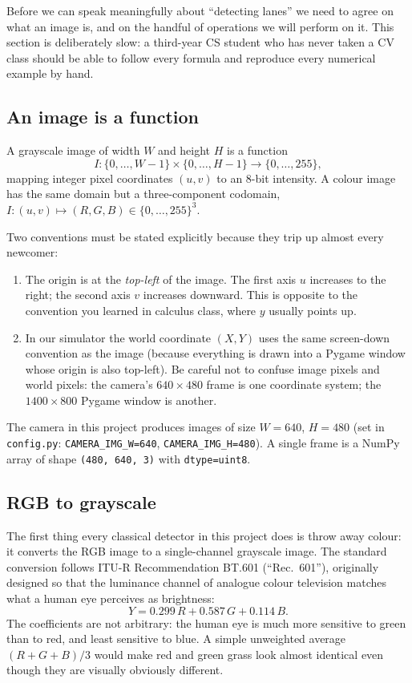 Before we can speak meaningfully about ``detecting lanes'' we need to
agree on what an image is, and on the handful of operations we will
perform on it. This section is deliberately slow: a third-year CS
student who has never taken a CV class should be able to follow every
formula and reproduce every numerical example by hand.

\subsection{An image is a function}

\begin{definition}
A grayscale image of width $W$ and height $H$ is a function
\[
I : \{0,\ldots,W-1\}\times\{0,\ldots,H-1\}\to\{0,\ldots,255\},
\]
mapping integer pixel coordinates $(u,v)$ to an 8-bit intensity. A
colour image has the same domain but a three-component codomain,
$I:(u,v)\mapsto(R,G,B)\in\{0,\ldots,255\}^3$.
\end{definition}

Two conventions must be stated explicitly because they trip up almost
every newcomer:
\begin{enumerate}[leftmargin=2em,itemsep=2pt]
  \item The origin is at the \emph{top-left} of the image. The first
        axis $u$ increases to the right; the second axis $v$ increases
        downward. This is opposite to the convention you learned in
        calculus class, where $y$ usually points up.
  \item In our simulator the world coordinate $(X,Y)$ uses the same
        screen-down convention as the image (because everything is
        drawn into a Pygame window whose origin is also top-left). Be
        careful not to confuse image pixels and world pixels: the
        camera's $640\times480$ frame is one coordinate system; the
        $1400\times800$ Pygame window is another.
\end{enumerate}
The camera in this project produces images of size $W=640$, $H=480$
(set in \texttt{config.py}: \texttt{CAMERA\_IMG\_W=640},
\texttt{CAMERA\_IMG\_H=480}). A single frame is a NumPy array of shape
\texttt{(480, 640, 3)} with \texttt{dtype=uint8}.

\subsection{RGB to grayscale}

The first thing every classical detector in this project does is throw
away colour: it converts the RGB image to a single-channel grayscale
image. The standard conversion follows ITU-R Recommendation BT.601
(``Rec.~601''), originally designed so that the luminance channel of
analogue colour television matches what a human eye perceives as
brightness:
\begin{equation}
Y = 0.299\,R + 0.587\,G + 0.114\,B.
\label{eq:gray}
\end{equation}
The coefficients are not arbitrary: the human eye is much more
sensitive to green than to red, and least sensitive to blue. A simple
unweighted average $(R+G+B)/3$ would make red and green grass look
almost identical even though they are visually obviously different.

